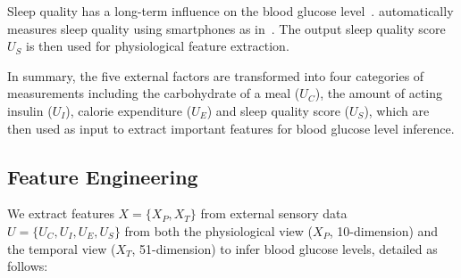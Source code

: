 Sleep quality has a long-term influence on the blood glucose level~\cite{bib:DRCP15:Iwasaki}.
\sysname automatically measures sleep quality using smartphones as in~\cite{bib:UbiComp14:Gu}.
The output sleep quality score $U_S$ is then used for physiological feature extraction.

In summary, the five external factors are transformed into four categories of measurements including the carbohydrate of a meal ($U_C$), the amount of acting insulin ($U_I$), calorie expenditure ($U_E$) and sleep quality score ($U_S$), which are then used as input to extract important features for blood glucose level inference.

\subsection{Feature Engineering}
\label{subsec:features}
We extract features $X=\{X_P, X_T\}$ from external sensory data $U=\{U_C, U_I, U_E, U_S\}$ from both the physiological view ($X_P$, 10-dimension) and the temporal view ($X_T$, 51-dimension) to infer blood glucose levels, detailed as follows:

